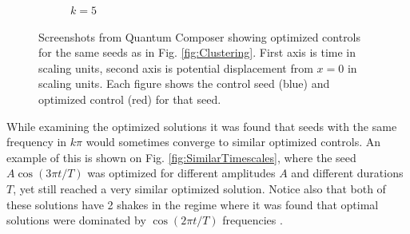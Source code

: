 \documentclass[a4paper, twocolumn]{revtex4-1}
\begin{document}
\begin{figure}
\begin{subfigure}{0.4\columnwidth}
		\caption{$k=5$}
	\end{subfigure}
	\caption{Screenshots from Quantum Composer showing  optimized controls for the same seeds as in Fig. \ref{fig:Clustering}. First axis is time in scaling units, second axis is potential displacement from $x=0$ in scaling units. Each figure shows the control seed (blue) and  optimized control (red) for that seed.}
	\label{fig:similarSolutions}
\end{figure}

While examining the optimized solutions it was found that seeds with the same frequency in $k\pi$ would sometimes converge to similar optimized controls. An example of this is shown on Fig. \ref{fig:SimilarTimescales}, where the seed $A\cos(3\pi t/T)$ was optimized for different amplitudes $A$ and different durations $T$, yet still reached a very similar optimized solution. Notice also that both of these solutions have 2 shakes in the regime where it was found that optimal solutions were dominated by $\cos(2\pi t/T)$ frequencies \cite{QM2Paper}.
\end{document}
